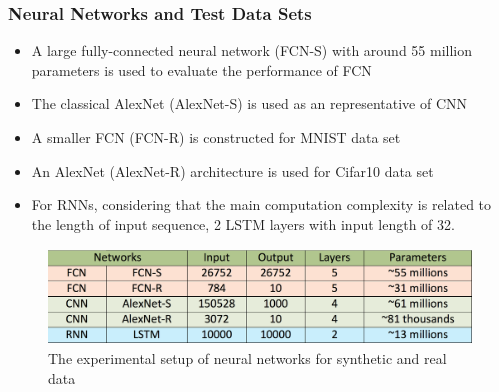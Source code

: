 
\begin{frame}
  \MyLogo
  \frametitle{Neural Networks and Test Data Sets}  

\medskip

\begin{itemize}

\item A large fully-connected neural network (\alert{FCN-S}) with around 55 million parameters is used to evaluate the performance of FCN

\item The classical AlexNet (\alert{AlexNet-S}) is used as an representative of CNN

\item A smaller FCN (\alert{FCN-R}) is constructed for MNIST data set

\item An AlexNet (\alert{AlexNet-R}) architecture is used for Cifar10 data set

\item For RNNs, considering that the main computation complexity is related to the length of input sequence, 2 LSTM layers with input length of 32.

\end{itemize}

\begin{figure}[htbp] 
\includegraphics[height=1in]{figures/models.png} 
\caption{The experimental setup of neural networks for synthetic and real data}
\end{figure}
	
\end{frame}


